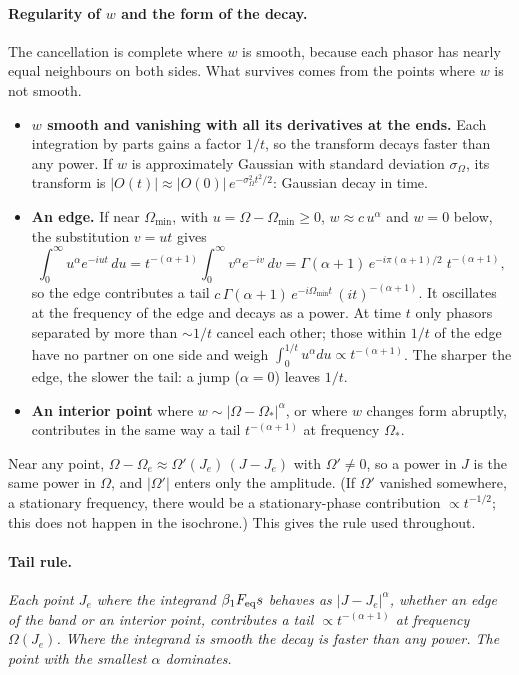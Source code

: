 \documentclass[11pt,a4paper]{article}
\begin{document}
\paragraph{Regularity of $w$ and the form of the decay.}
\label{sec:regularidad}
The cancellation is complete where $w$ is smooth, because each phasor has nearly equal
neighbours on both sides. What survives comes from the points where $w$ is not smooth.
\begin{itemize}
\item \textbf{$w$ smooth and vanishing with all its derivatives at the ends.} Each
integration by parts gains a factor $1/t$, so the transform decays faster than any
power. If $w$ is approximately Gaussian with standard deviation $\sigma_\Omega$, its transform
is $|O(t)|\approx|O(0)|\,e^{-\sigma_\Omega^2t^2/2}$: Gaussian decay in time.
\item \textbf{An edge.} If near $\Omega_{\min}$, with $u=\Omega-\Omega_{\min}\ge0$, $w\approx c\,u^\alpha$
and $w=0$ below, the substitution $v=ut$ gives
\[
  \int_0^\infty u^\alpha e^{-iut}\,du = t^{-(\alpha+1)}\int_0^\infty v^\alpha e^{-iv}\,dv
  = \Gamma(\alpha+1)\,e^{-i\pi(\alpha+1)/2}\;t^{-(\alpha+1)},
\]
so the edge contributes a tail $c\,\Gamma(\alpha+1)\,e^{-i\Omega_{\min}t}\,(it)^{-(\alpha+1)}$. It
oscillates at the frequency of the edge and decays as a power. At time $t$ only phasors
separated by more than $\sim1/t$ cancel each other; those within $1/t$ of the edge have no
partner on one side and weigh $\int_0^{1/t}u^\alpha du\propto t^{-(\alpha+1)}$. The sharper the
edge, the slower the tail: a jump ($\alpha=0$) leaves $1/t$.
\item \textbf{An interior point} where $w\sim|\Omega-\Omega_*|^\alpha$, or where $w$ changes form
abruptly, contributes in the same way a tail $t^{-(\alpha+1)}$ at frequency $\Omega_*$.
\end{itemize}
Near any point, $\Omega-\Omega_e\approx\Omega'(J_e)\,(J-J_e)$ with $\Omega'\ne0$, so a power in $J$ is
the same power in $\Omega$, and $|\Omega'|$ enters only the amplitude. (If $\Omega'$ vanished
somewhere, a stationary frequency, there would be a stationary-phase contribution
$\propto t^{-1/2}$; this does not happen in the isochrone.) This gives the rule used
throughout.

\paragraph{Tail rule.} \emph{Each point $J_e$ where the integrand $\beta_1F_{\rm eq}s$ behaves as
$|J-J_e|^\alpha$, whether an edge of the band or an interior point, contributes a tail
$\propto t^{-(\alpha+1)}$ at frequency $\Omega(J_e)$. Where the integrand is smooth the decay is
faster than any power. The point with the smallest $\alpha$ dominates.}
\end{document}
